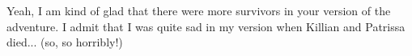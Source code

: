 Yeah, I am kind of glad that there were more survivors in your version of the adventure. I admit that I was quite sad in my version when Killian and Patrissa died... (so, so horribly!)\\

